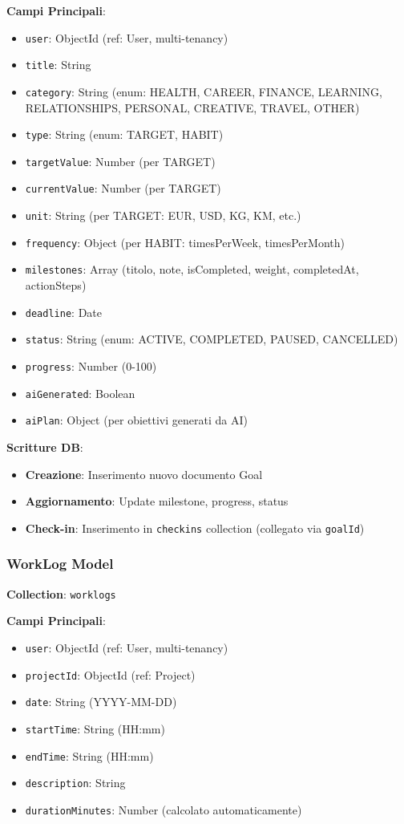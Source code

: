 \documentclass[11pt,a4paper]{article}
\begin{document}
\textbf{Campi Principali}:
\begin{itemize}
    \item \texttt{user}: ObjectId (ref: User, multi-tenancy)
    \item \texttt{title}: String
    \item \texttt{category}: String (enum: HEALTH, CAREER, FINANCE, LEARNING, RELATIONSHIPS, PERSONAL, CREATIVE, TRAVEL, OTHER)
    \item \texttt{type}: String (enum: TARGET, HABIT)
    \item \texttt{targetValue}: Number (per TARGET)
    \item \texttt{currentValue}: Number (per TARGET)
    \item \texttt{unit}: String (per TARGET: EUR, USD, KG, KM, etc.)
    \item \texttt{frequency}: Object (per HABIT: timesPerWeek, timesPerMonth)
    \item \texttt{milestones}: Array (titolo, note, isCompleted, weight, completedAt, actionSteps)
    \item \texttt{deadline}: Date
    \item \texttt{status}: String (enum: ACTIVE, COMPLETED, PAUSED, CANCELLED)
    \item \texttt{progress}: Number (0-100)
    \item \texttt{aiGenerated}: Boolean
    \item \texttt{aiPlan}: Object (per obiettivi generati da AI)
\end{itemize}

\textbf{Scritture DB}:
\begin{itemize}
    \item \textbf{Creazione}: Inserimento nuovo documento Goal
    \item \textbf{Aggiornamento}: Update milestone, progress, status
    \item \textbf{Check-in}: Inserimento in \texttt{checkins} collection (collegato via \texttt{goalId})
\end{itemize}

\subsubsection{WorkLog Model}

\textbf{Collection}: \texttt{worklogs}

\textbf{Campi Principali}:
\begin{itemize}
    \item \texttt{user}: ObjectId (ref: User, multi-tenancy)
    \item \texttt{projectId}: ObjectId (ref: Project)
    \item \texttt{date}: String (YYYY-MM-DD)
    \item \texttt{startTime}: String (HH:mm)
    \item \texttt{endTime}: String (HH:mm)
    \item \texttt{description}: String
    \item \texttt{durationMinutes}: Number (calcolato automaticamente)
\end{itemize}
\end{document}
